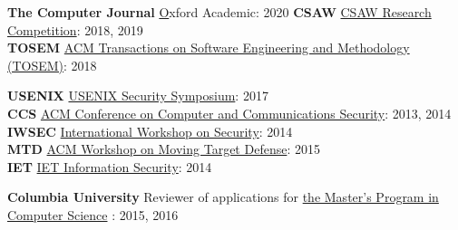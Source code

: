 

\begin{cvparagraph}
    \textbf{The Computer Journal} \hspace*{1pt} \href{https://academic.oup.com/comjnl} Oxford Academic: 2020
    \textbf{CSAW}  \hspace*{1pt} \href{https://csaw.engineering.nyu.edu/}{CSAW Research Competition}: 2018, 2019 \\
    \textbf{TOSEM} \hspace*{1pt} \href{https://tosem.acm.org/} {ACM Transactions on Software Engineering and Methodology (TOSEM)}: 2018
\end{cvparagraph}


\begin{cvparagraph}
    \textbf{USENIX} \hspace*{1pt} \href{https://www.usenix.org/conference/usenixsecurity17} {USENIX Security Symposium}: 2017\\
    \textbf{CCS} \hspace*{17pt} \href{https://www.sigsac.org/ccs/CCS2014/}
        {ACM Conference on Computer and Communications Security}: 2013, 2014\\
    \textbf{IWSEC} \hspace*{6pt} \href{http://www.iwsec.org/2014/}{International Workshop on Security}: 2014 \\
    \textbf{MTD} \hspace*{15pt}
    \href{http://mtd.mobicloud.asu.edu/}{ACM Workshop on Moving Target Defense}: 2015\\
    \textbf{IET} \hspace*{20pt}
    \href{http://digital-library.theiet.org/content/journals/iet-ifs}{IET Information Security}: 2014
\end{cvparagraph}


\begin{cvparagraph}
    \textbf{Columbia University} \hspace*{10pt} Reviewer of applications for \href{http://www.cs.columbia.edu/education/ms/}{the Master's Program in Computer Science} \hspace*{1pt}: 2015, 2016
\end{cvparagraph}
